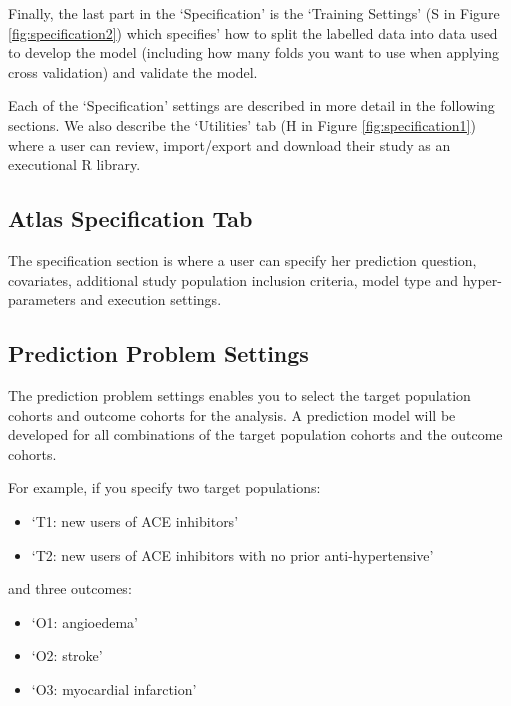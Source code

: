 \documentclass[11pt]{book}
\providecommand{\tightlist}{%
  \setlength{\itemsep}{0pt}\setlength{\parskip}{0pt}}
\theoremstyle{definition}
\theoremstyle{definition}
\theoremstyle{definition}
\theoremstyle{remark}
\begin{document}
Finally, the last part in the `Specification' is the `Training Settings' (S in Figure \ref{fig:specification2}) which specifies' how to split the labelled data into data used to develop the model (including how many folds you want to use when applying cross validation) and validate the model.

Each of the `Specification' settings are described in more detail in the following sections. We also describe the `Utilities' tab (H in Figure \ref{fig:specification1}) where a user can review, import/export and download their study as an executional R library.

\hypertarget{atlas-specification-tab}{%
\subsection{Atlas Specification Tab}\label{atlas-specification-tab}}

The specification section is where a user can specify her prediction question, covariates, additional study population inclusion criteria, model type and hyper-parameters and execution settings.

\hypertarget{prediction-problem-settings}{%
\subsection{Prediction Problem Settings}\label{prediction-problem-settings}}

The prediction problem settings enables you to select the target population cohorts and outcome cohorts for the analysis. A prediction model will be developed for all combinations of the target population cohorts and the outcome cohorts.

For example, if you specify two target populations:

\begin{itemize}
\tightlist
\item
  `T1: new users of ACE inhibitors'
\item
  `T2: new users of ACE inhibitors with no prior anti-hypertensive'
\end{itemize}

and three outcomes:

\begin{itemize}
\tightlist
\item
  `O1: angioedema'
\item
  `O2: stroke'
\item
  `O3: myocardial infarction'
\end{itemize}
\end{document}
